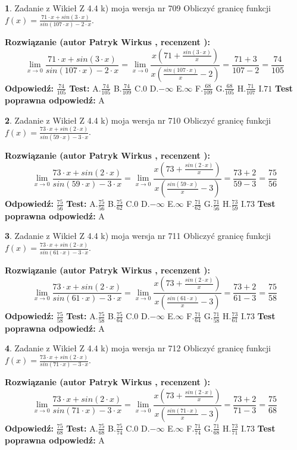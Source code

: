 \documentclass[12pt, a4paper]{article}
\theoremstyle{definition} %
\newtheorem{zad}{}
\newcommand{\zadStart}[1]{\begin{zad}#1\newline}
\newcommand{\zadStop}{\end{zad}}
\newcommand{\rozwStart}[2]{\noindent \textbf{Rozwiązanie (autor #1 , recenzent #2): }\newline}
\newcommand{\rozwStop}{\newline}
\newcommand{\odpStart}{\noindent \textbf{Odpowiedź:}\newline}
\newcommand{\odpStop}{\newline}
\newcommand{\testStart}{\noindent \textbf{Test:}\newline}
\newcommand{\testStop}{\newline}
\newcommand{\kluczStart}{\noindent \textbf{Test poprawna odpowiedź:}\newline}
\newcommand{\kluczStop}{\newline}
\begin{document}
\zadStart{Zadanie z Wikieł Z 4.4 k) moja wersja nr 709}
Obliczyć granicę funkcji $f(x)=\frac{71\cdot x +sin(3\cdot x)}{sin(107\cdot x) -2\cdot x}$.
\zadStop
\rozwStart{Patryk Wirkus}{}
$$\lim\limits_{x\to 0}\frac{71\cdot x +sin(3\cdot x)}{sin(107\cdot x) -2\cdot x}
=\lim\limits_{x\to 0}\frac{x(71+\frac{sin(3\cdot x)}{x})}{x(\frac{sin(107\cdot x)}{x}-2)}
=\frac{71+3}{107-2} = \frac{74}{105}$$
\rozwStop
\odpStart
$\frac{74}{105}$
\odpStop
\testStart
A.$\frac{74}{105}$
B.$\frac{74}{109}$
C.$0$
D.$-\infty$
E.$\infty$
F.$\frac{68}{109}$
G.$\frac{68}{105}$
H.$\frac{71}{107}$
I.$71$
\testStop
\kluczStart
A
\kluczStop



\zadStart{Zadanie z Wikieł Z 4.4 k) moja wersja nr 710}
Obliczyć granicę funkcji $f(x)=\frac{73\cdot x +sin(2\cdot x)}{sin(59\cdot x) -3\cdot x}$.
\zadStop
\rozwStart{Patryk Wirkus}{}
$$\lim\limits_{x\to 0}\frac{73\cdot x +sin(2\cdot x)}{sin(59\cdot x) -3\cdot x}
=\lim\limits_{x\to 0}\frac{x(73+\frac{sin(2\cdot x)}{x})}{x(\frac{sin(59\cdot x)}{x}-3)}
=\frac{73+2}{59-3} = \frac{75}{56}$$
\rozwStop
\odpStart
$\frac{75}{56}$
\odpStop
\testStart
A.$\frac{75}{56}$
B.$\frac{75}{62}$
C.$0$
D.$-\infty$
E.$\infty$
F.$\frac{71}{62}$
G.$\frac{71}{56}$
H.$\frac{73}{59}$
I.$73$
\testStop
\kluczStart
A
\kluczStop



\zadStart{Zadanie z Wikieł Z 4.4 k) moja wersja nr 711}
Obliczyć granicę funkcji $f(x)=\frac{73\cdot x +sin(2\cdot x)}{sin(61\cdot x) -3\cdot x}$.
\zadStop
\rozwStart{Patryk Wirkus}{}
$$\lim\limits_{x\to 0}\frac{73\cdot x +sin(2\cdot x)}{sin(61\cdot x) -3\cdot x}
=\lim\limits_{x\to 0}\frac{x(73+\frac{sin(2\cdot x)}{x})}{x(\frac{sin(61\cdot x)}{x}-3)}
=\frac{73+2}{61-3} = \frac{75}{58}$$
\rozwStop
\odpStart
$\frac{75}{58}$
\odpStop
\testStart
A.$\frac{75}{58}$
B.$\frac{75}{64}$
C.$0$
D.$-\infty$
E.$\infty$
F.$\frac{71}{64}$
G.$\frac{71}{58}$
H.$\frac{73}{61}$
I.$73$
\testStop
\kluczStart
A
\kluczStop



\zadStart{Zadanie z Wikieł Z 4.4 k) moja wersja nr 712}
Obliczyć granicę funkcji $f(x)=\frac{73\cdot x +sin(2\cdot x)}{sin(71\cdot x) -3\cdot x}$.
\zadStop
\rozwStart{Patryk Wirkus}{}
$$\lim\limits_{x\to 0}\frac{73\cdot x +sin(2\cdot x)}{sin(71\cdot x) -3\cdot x}
=\lim\limits_{x\to 0}\frac{x(73+\frac{sin(2\cdot x)}{x})}{x(\frac{sin(71\cdot x)}{x}-3)}
=\frac{73+2}{71-3} = \frac{75}{68}$$
\rozwStop
\odpStart
$\frac{75}{68}$
\odpStop
\testStart
A.$\frac{75}{68}$
B.$\frac{75}{74}$
C.$0$
D.$-\infty$
E.$\infty$
F.$\frac{71}{74}$
G.$\frac{71}{68}$
H.$\frac{73}{71}$
I.$73$
\testStop
\kluczStart
A
\kluczStop
\end{document}
